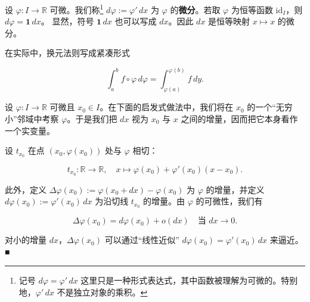 \begin{remark}

\begin{items}
\item

设 $ \varphi : I \to \mathbb{R} $ 可微。我们称\footnote{记号 $ d\varphi = \varphi' \, dx $ 这里只是一种形式表达式，其中函数被理解为可微的。特别地，$ \varphi' \, dx $ 不是独立对象的乘积。} $ d\varphi := \varphi' \, dx $ 为 $ \varphi $ 的\textbf{微分}。若取 $ \varphi $ 为恒等函数 $ \mathrm{id}_I $，则 $ d\varphi = \mathbf{1} \, dx $。
显然，符号 $ \mathbf{1} \, dx $ 也可以写成 $ dx $。因此 $ dx $ 是恒等映射 $ x \mapsto x $ 的微分。

\item

在实际中，换元法则写成紧凑形式

\[
\int_{a}^{b} f \circ \varphi \, d\varphi = \int_{\varphi(a)}^{\varphi(b)} f \, dy .
\]
\item

设 $ \varphi : I \to \mathbb{R} $ 可微且 $ x_0 \in I $。在下面的启发式做法中，我们将在 $ x_0 $ 的一个“无穷小”邻域中考察 $ \varphi $。于是我们把 $ dx $ 视为 $ x_0 $ 与 $ x $ 之间的增量，因而把它本身看作一个实变量。

\end{items}


设 $ t_{x_0} $ 在点 $ (x_0, \varphi(x_0)) $ 处与 $ \varphi $ 相切：

\[
t_{x_0} : \mathbb{R} \to \mathbb{R} , \quad x \mapsto \varphi(x_0) + \varphi'(x_0)(x - x_0) .
\]

此外，定义 $ \Delta\varphi(x_0) := \varphi(x_0 + dx) - \varphi(x_0) $ 为 $ \varphi $ 的增量，并定义 $ d\varphi(x_0) := \varphi'(x_0) \, dx $ 为沿切线 $ t_{x_0} $ 的增量。由 $ \varphi $ 的可微性，我们有

\[
\Delta\varphi(x_0) = d\varphi(x_0) + o(dx) \quad \text{当 } dx \to 0 .
\]

对小的增量 $ dx $，$ \Delta\varphi(x_0) $ 可以通过“线性近似” $ d\varphi(x_0) = \varphi'(x_0) \, dx $ 来逼近。\nobreak\hspace{0.35em}■

\end{remark}

